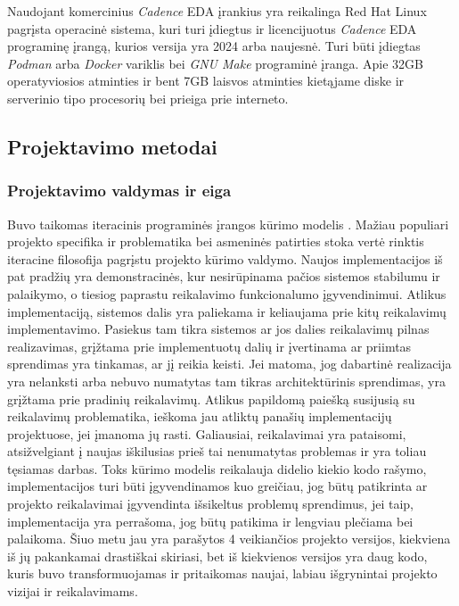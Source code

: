 Naudojant komercinius \textit{Cadence} EDA įrankius yra reikalinga Red Hat Linux pagrįsta operacinė sistema, kuri turi įdiegtus ir licencijuotus \textit{Cadence} EDA programinę įrangą, kurios versija yra 2024 arba naujesnė. Turi būti įdiegtas \textit{Podman} arba \textit{Docker} variklis bei \textit{GNU Make} programinė įranga. Apie 32GB operatyviosios atminties ir bent 7GB laisvos atminties kietąjame diske ir serverinio tipo procesorių bei prieiga prie interneto.


\subsection{Projektavimo metodai}

\subsubsection{Projektavimo valdymas ir eiga}

Buvo taikomas iteracinis programinės įrangos kūrimo modelis \lent{\ref{fig:uml_state_project_workflow}}. Mažiau populiari projekto specifika ir problematika bei asmeninės patirties stoka vertė rinktis iteracine filosofija pagrįstu projekto kūrimo valdymo. Naujos implementacijos iš pat pradžių yra demonstracinės, kur nesirūpinama pačios sistemos stabilumu ir palaikymo, o tiesiog paprastu reikalavimo funkcionalumo įgyvendinimui. Atlikus implementaciją, sistemos dalis yra paliekama ir keliaujama prie kitų reikalavimų implementavimo. Pasiekus tam tikra sistemos ar jos dalies reikalavimų pilnas realizavimas, grįžtama prie implementuotų dalių ir įvertinama ar priimtas sprendimas yra tinkamas, ar jį reikia keisti. Jei matoma, jog dabartinė realizacija yra nelanksti arba nebuvo numatytas tam tikras architektūrinis sprendimas, yra grįžtama prie pradinių reikalavimų. Atlikus papildomą paiešką susijusią su reikalavimų problematika, ieškoma jau atliktų panašių implementacijų  projektuose, jei įmanoma jų rasti. Galiausiai, reikalavimai yra pataisomi, atsižvelgiant į naujas iškilusias prieš tai nenumatytas problemas ir yra toliau tęsiamas darbas. Toks kūrimo modelis reikalauja didelio kiekio kodo rašymo, implementacijos turi būti įgyvendinamos kuo greičiau, jog būtų patikrinta ar projekto reikalavimai įgyvendinta išsikeltus problemų sprendimus, jei taip, implementacija yra perrašoma, jog būtų patikima ir lengviau plečiama bei palaikoma. Šiuo metu jau yra parašytos 4 veikiančios projekto versijos, kiekviena iš jų pakankamai drastiškai skiriasi, bet iš kiekvienos versijos yra daug kodo, kuris buvo transformuojamas ir pritaikomas naujai, labiau išgrynintai projekto vizijai ir reikalavimams.

